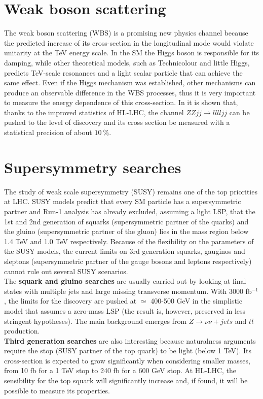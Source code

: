 \documentclass[a4paper,twoside,12pt]{book}
\begin{document}
\section{Weak boson scattering}
The weak boson scattering (WBS) is a promising new physics channel because the predicted increase of
its cross-section
in the longitudinal mode would violate unitarity at the TeV energy scale. In the SM the Higgs
boson is responsible for its damping, while other theoretical models, such as Technicolour and 
little Higgs, predicts TeV-scale resonances and a light scalar particle that can achieve the same effect. Even if the Higgs
mechanism was established, other mechanisms can produce an observable difference in
the WBS processes, thus it is very important to measure the energy 
dependence of this cross-section. In \cite{WBS} it is shown that, thanks to the improved
statistics of HL-LHC, the channel $ZZjj \rightarrow lllljj$ can be pushed to the level of discovery and its cross section be measured with a statistical precision of about $10\ \%$.

\section{Supersymmetry searches}
The study of weak scale supersymmetry (SUSY) remains one of the top priorities at LHC.
SUSY models predict that every SM particle has a supersymmetric partner and Run-1 analysis
has already excluded, assuming a light LSP, that the 1st and 2nd generation of squarks (supersymmetric partner of the quarks) and the gluino (supersymmetric partner of the gluon) lies in the mass region below 1.4 TeV and 1.0
TeV respectively. Because of the flexibility on the parameters of the SUSY models, 
the current limits on 3rd generation squarks, gauginos and sleptons (supersymmetric partner
of the gauge bosons and leptons respectively) cannot rule out several SUSY scenarios.\\

The \textbf{squark and gluino searches} are usually carried out by looking at final states
with multiple jets and large missing transverse momentum. With 3000 fb$^{-1}$, the limits for the discovery are pushed at $\simeq$ 400-500 GeV\cite{loi} in the 
simplistic model that assumes a zero-mass LSP (the result is, however, preserved in less
stringent hypotheses). The main background emerges from $Z \rightarrow \nu\nu + jets$ and 
$t\bar{t}$ production.\\

\textbf{Third generation searches} are also interesting because naturalness arguments require
the stop (SUSY partner of the top quark) to be light (below 1 TeV). Its cross-section is expected to grow significantly when 
considering smaller masses, from 10 fb for a 1 TeV stop to 240 fb for a 600 GeV stop. At
HL-LHC, the sensibility for the top squark will significantly increase and, if found, it will be possible to measure its properties. \\
\end{document}
